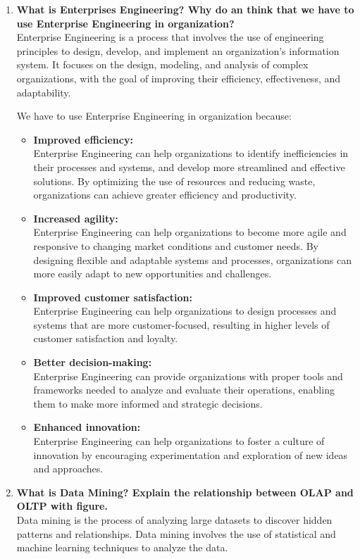 \documentclass[12pt]{article}
\begin{document}
\begin{enumerate}
\item {\bfseries What is Enterprises Engineering? Why do an think that we have to use Enterprise Engineering in organization?\\}
Enterprise Engineering is a process that involves the use of engineering principles to design, develop, and implement an organization's information system. It focuses on the design, modeling, and analysis of complex organizations, with the goal of improving their efficiency, effectiveness, and adaptability.

We have to use Enterprise Engineering in organization because: 

\begin{itemize}
    \item \textbf{Improved efficiency:\\} Enterprise Engineering can help organizations to identify inefficiencies in their processes and systems, and develop more streamlined and effective solutions. By optimizing the use of resources and reducing waste, organizations can achieve greater efficiency and productivity.
    \item \textbf{Increased agility:\\} Enterprise Engineering can help organizations to become more agile and responsive to changing market conditions and customer needs. By designing flexible and adaptable systems and processes, organizations can more easily adapt to new opportunities and challenges.
    \item \textbf{Improved customer satisfaction:\\} Enterprise Engineering can help organizations to design processes and systems that are more customer-focused, resulting in higher levels of customer satisfaction and loyalty.
    \item \textbf{Better decision-making:\\}  Enterprise Engineering can provide organizations with proper tools and frameworks needed to analyze and evaluate their operations, enabling them to make more informed and strategic decisions.
    \item \textbf{Enhanced innovation:\\} Enterprise Engineering can help organizations to foster a culture of innovation by encouraging experimentation and exploration of new ideas and approaches.
    \end{itemize}

    
    \item {\bfseries What is Data Mining? Explain the relationship between OLAP and OLTP with figure.\\}
    Data mining is the process of analyzing large datasets to discover hidden patterns and relationships. Data mining involves the use of statistical and machine learning techniques to analyze the data.


\end{enumerate}
\end{document}

